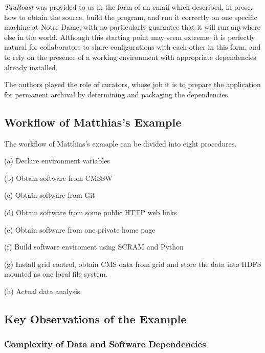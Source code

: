 \documentclass{acm_proc_article-sp}
\begin{document}
\emph{TauRoast} was provided to us in the form of an
email which described, in prose, how to obtain the source,
build the program, and run it correctly on one specific
machine at Notre Dame, with no particularly guarantee that
it will run anywhere else in the world.
Although this starting point may seem extreme, it is
perfectly natural for collaborators to share configurations
with each other in this form, and to rely on the presence
of a working environment with appropriate dependencies already
installed.

The authors played the role of curators, whose job it is to prepare the application for permanent archival by determining and packaging the dependencies.

\subsection{Workflow of Matthias's Example}

The workflow of Matthias's exmaple can be divided into eight procedures.

(a) Declare environment variables

(b) Obtain software from CMSSW

(c) Obtain software from Git

(d) Obtain software from some public HTTP web links

(e) Obtain software from one private home page

(f) Build software enviroment using SCRAM and Python

(g) Install grid control, obtain CMS data from grid and store the data into HDFS mounted as one local file system.

(h) Actual data analysis.

\subsection{Key Observations of the Example}

\subsubsection{Complexity of Data and Software Dependencies}
\end{document}
